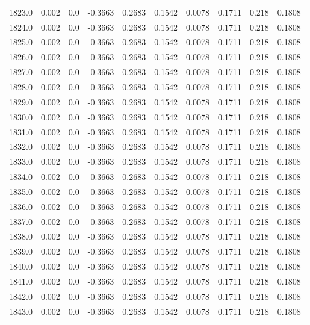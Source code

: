\begin{longtable}{lrrrrrrrrr}
1823.0 & 0.002 & 0.0 & -0.3663 & 0.2683 & 0.1542 & 0.0078 & 0.1711 & 0.218 & 0.1808 \\
1824.0 & 0.002 & 0.0 & -0.3663 & 0.2683 & 0.1542 & 0.0078 & 0.1711 & 0.218 & 0.1808 \\
1825.0 & 0.002 & 0.0 & -0.3663 & 0.2683 & 0.1542 & 0.0078 & 0.1711 & 0.218 & 0.1808 \\
1826.0 & 0.002 & 0.0 & -0.3663 & 0.2683 & 0.1542 & 0.0078 & 0.1711 & 0.218 & 0.1808 \\
1827.0 & 0.002 & 0.0 & -0.3663 & 0.2683 & 0.1542 & 0.0078 & 0.1711 & 0.218 & 0.1808 \\
1828.0 & 0.002 & 0.0 & -0.3663 & 0.2683 & 0.1542 & 0.0078 & 0.1711 & 0.218 & 0.1808 \\
1829.0 & 0.002 & 0.0 & -0.3663 & 0.2683 & 0.1542 & 0.0078 & 0.1711 & 0.218 & 0.1808 \\
1830.0 & 0.002 & 0.0 & -0.3663 & 0.2683 & 0.1542 & 0.0078 & 0.1711 & 0.218 & 0.1808 \\
1831.0 & 0.002 & 0.0 & -0.3663 & 0.2683 & 0.1542 & 0.0078 & 0.1711 & 0.218 & 0.1808 \\
1832.0 & 0.002 & 0.0 & -0.3663 & 0.2683 & 0.1542 & 0.0078 & 0.1711 & 0.218 & 0.1808 \\
1833.0 & 0.002 & 0.0 & -0.3663 & 0.2683 & 0.1542 & 0.0078 & 0.1711 & 0.218 & 0.1808 \\
1834.0 & 0.002 & 0.0 & -0.3663 & 0.2683 & 0.1542 & 0.0078 & 0.1711 & 0.218 & 0.1808 \\
1835.0 & 0.002 & 0.0 & -0.3663 & 0.2683 & 0.1542 & 0.0078 & 0.1711 & 0.218 & 0.1808 \\
1836.0 & 0.002 & 0.0 & -0.3663 & 0.2683 & 0.1542 & 0.0078 & 0.1711 & 0.218 & 0.1808 \\
1837.0 & 0.002 & 0.0 & -0.3663 & 0.2683 & 0.1542 & 0.0078 & 0.1711 & 0.218 & 0.1808 \\
1838.0 & 0.002 & 0.0 & -0.3663 & 0.2683 & 0.1542 & 0.0078 & 0.1711 & 0.218 & 0.1808 \\
1839.0 & 0.002 & 0.0 & -0.3663 & 0.2683 & 0.1542 & 0.0078 & 0.1711 & 0.218 & 0.1808 \\
1840.0 & 0.002 & 0.0 & -0.3663 & 0.2683 & 0.1542 & 0.0078 & 0.1711 & 0.218 & 0.1808 \\
1841.0 & 0.002 & 0.0 & -0.3663 & 0.2683 & 0.1542 & 0.0078 & 0.1711 & 0.218 & 0.1808 \\
1842.0 & 0.002 & 0.0 & -0.3663 & 0.2683 & 0.1542 & 0.0078 & 0.1711 & 0.218 & 0.1808 \\
1843.0 & 0.002 & 0.0 & -0.3663 & 0.2683 & 0.1542 & 0.0078 & 0.1711 & 0.218 & 0.1808 \\

\end{longtable}
